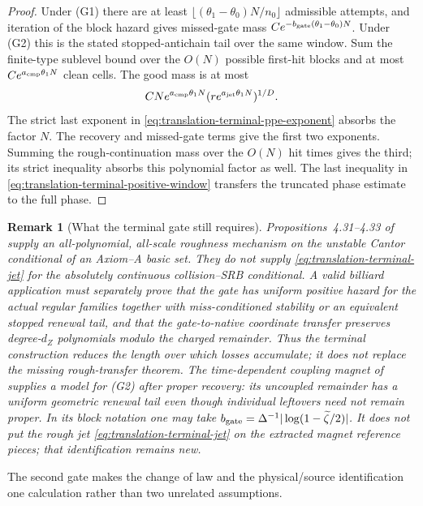 \documentclass[11pt]{article}
\newtheorem{remark}[theorem]{Remark}
\begin{document}
\begin{proof}
Under \textup{(G1)} there are at least
$\lfloor(\theta_1-\theta_0)N/n_0\rfloor$ admissible attempts, and iteration
of the block hazard gives missed-gate mass
$Ce^{-b_{\rm gate}(\theta_1-\theta_0)N}$.  Under \textup{(G2)} this is the
stated stopped-antichain tail over the same window.  Sum the finite-type sublevel
bound over the $O(N)$ possible first-hit blocks and at most
$Ce^{a_{\rm cmp}\theta_1N}$ clean cells.  The good mass is at most
\[
 CN e^{a_{\rm cmp}\theta_1N}
       (r e^{a_{\rm jet}\theta_1N})^{1/D}.
\]
The strict last exponent in
\eqref{eq:translation-terminal-ppe-exponent} absorbs the factor $N$.
The recovery and missed-gate terms give the first two exponents.  Summing the
rough-continuation mass over the $O(N)$ hit times gives the third; its strict
inequality absorbs this polynomial factor as well.  The last inequality in
\eqref{eq:translation-terminal-positive-window} transfers the truncated
phase estimate to the full phase.
\end{proof}

\begin{remark}[What the terminal gate still requires]
\label{rem:translation-terminal-rough-transfer}
Propositions~4.31--4.33 of \cite{Leclerc2026} supply an all-polynomial,
all-scale roughness mechanism on the unstable Cantor conditional of an
Axiom--A basic set.  They do not supply
\eqref{eq:translation-terminal-jet} for the absolutely continuous
collision--SRB conditional.  A valid billiard application must separately
prove that the gate has uniform positive hazard for the actual regular
families together with miss-conditioned stability or an equivalent stopped
renewal tail, and that the
gate-to-native coordinate transfer preserves degree-$d_Z$ polynomials
modulo the charged remainder.  Thus the terminal construction reduces the
length over which losses accumulate; it does not replace the missing
rough-transfer theorem.
The time-dependent coupling magnet of \cite[Sections~5--7 and
Corollary~34]{SYZ} supplies a model for \textup{(G2)} after proper recovery:
its uncoupled remainder has a uniform geometric renewal tail even though
individual leftovers need not remain proper.  In its block notation one may
take
$b_{\rm gate}=\Delta^{-1}|\log(1-\widetilde\zeta/2)|$.
It does not put the rough jet
\eqref{eq:translation-terminal-jet} on the extracted magnet reference
pieces; that identification remains new.
\end{remark}

The second gate makes the change of law and the physical/source
identification one calculation rather than two unrelated assumptions.
\end{document}
